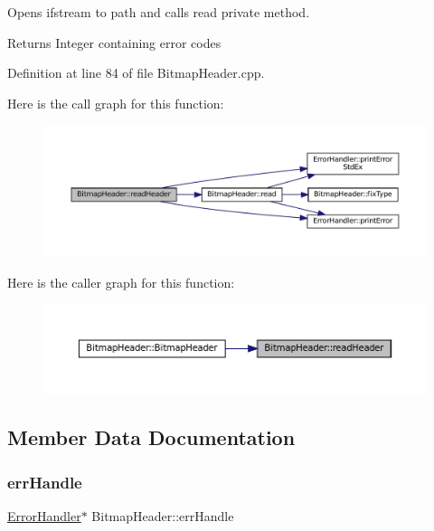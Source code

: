Opens ifstream to path and calls read private method. 

\begin{DoxyReturn}{Returns}
Integer containing error codes 
\end{DoxyReturn}


Definition at line 84 of file Bitmap\+Header.\+cpp.

Here is the call graph for this function\+:\nopagebreak
\begin{figure}[H]
\begin{center}
\leavevmode
\includegraphics[width=350pt]{classBitmapHeader_a66adc11592dc1d18edbd46bade1db242_cgraph}
\end{center}
\end{figure}
Here is the caller graph for this function\+:\nopagebreak
\begin{figure}[H]
\begin{center}
\leavevmode
\includegraphics[width=350pt]{classBitmapHeader_a66adc11592dc1d18edbd46bade1db242_icgraph}
\end{center}
\end{figure}


\subsection{Member Data Documentation}
\mbox{\label{classBitmapHeader_ab06f141245d592302dabe48571d12e32}} 
\subsubsection{\texorpdfstring{errHandle}{errHandle}}
{\footnotesize\ttfamily \mbox{\hyperlink{classErrorHandler}{Error\+Handler}}$\ast$ Bitmap\+Header\+::err\+Handle\hspace{0.3cm}{\ttfamily [private]}}

